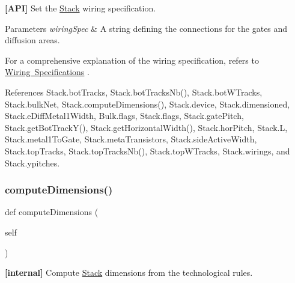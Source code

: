 {\bfseries \mbox{[}A\+PI\mbox{]}} Set the \mbox{\hyperlink{classpython_1_1Stack_1_1Stack}{Stack}} wiring specification. 


\begin{DoxyParams}{Parameters}
{\em wiring\+Spec} & A string defining the connections for the gates and diffusion areas.\\
\hline
\end{DoxyParams}
For a comprehensive explanation of the wiring specification, refers to \mbox{\hyperlink{classpython_1_1Stack_1_1Stack_secWiringSpecs}{Wiring Specifications}} . 

References Stack.\+bot\+Tracks, Stack.\+bot\+Tracks\+Nb(), Stack.\+bot\+W\+Tracks, Stack.\+bulk\+Net, Stack.\+compute\+Dimensions(), Stack.\+device, Stack.\+dimensioned, Stack.\+e\+Diff\+Metal1\+Width, Bulk.\+flags, Stack.\+flags, Stack.\+gate\+Pitch, Stack.\+get\+Bot\+Track\+Y(), Stack.\+get\+Horizontal\+Width(), Stack.\+hor\+Pitch, Stack.\+L, Stack.\+metal1\+To\+Gate, Stack.\+meta\+Transistors, Stack.\+side\+Active\+Width, Stack.\+top\+Tracks, Stack.\+top\+Tracks\+Nb(), Stack.\+top\+W\+Tracks, Stack.\+wirings, and Stack.\+ypitches.

\mbox{\label{classpython_1_1Stack_1_1Stack_a74ff17e974efecc28c792db05b5d3eb0}} 
\subsubsection{\texorpdfstring{compute\+Dimensions()}{computeDimensions()}}
{\footnotesize\ttfamily def compute\+Dimensions (\begin{DoxyParamCaption}\item[{}]{self }\end{DoxyParamCaption})}



{\bfseries \mbox{[}internal\mbox{]}} Compute \mbox{\hyperlink{classpython_1_1Stack_1_1Stack}{Stack}} dimensions from the technological rules. 

